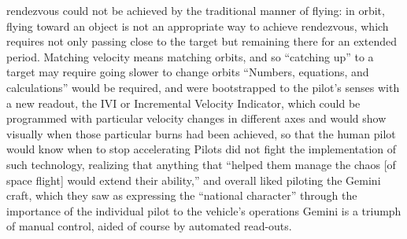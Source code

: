 rendezvous could not be achieved by the
traditional manner of flying: in orbit, flying toward an object is not
an appropriate way to achieve rendezvous, which requires not only
passing close to the target but remaining there for an extended
period. Matching velocity means matching orbits, and so ``catching
up'' to a target may require going slower to change orbits\cite[p.
  86]{???-DM} ``Numbers, equations, and calculations'' would be
required, and were bootstrapped to the pilot's senses with a new
readout, the IVI or Incremental Velocity Indicator, which could be
programmed with particular velocity changes in different axes and
would show visually when those particular burns had been achieved,
so that the human pilot would know when to stop accelerating\cite[p.
  86-87]{???-DM} Pilots did not fight the implementation of such
technology, realizing that anything that ``helped them manage the
chaos [of space flight] would extend their ability,'' and overall
liked piloting the Gemini craft, which they saw as expressing the
``national character'' through the importance of the individual pilot
to the vehicle's operations\cite[p. 88]{???-DM} Gemini is 
a triumph of manual control, aided of course by automated read-outs.

